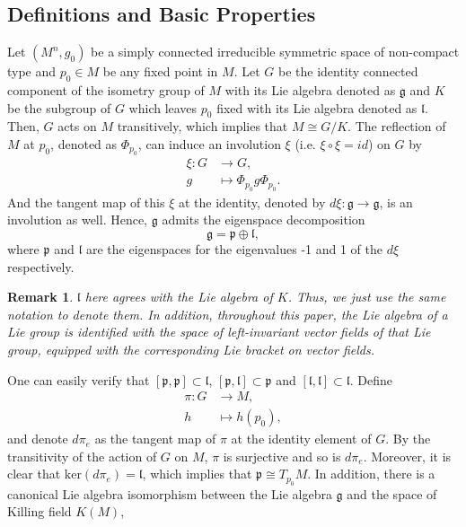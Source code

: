 \documentclass[12pt]{amsart}
\newtheorem{remark}{Remark}[section]
\begin{document}
\subsection{Definitions and Basic Properties}
Let $(M^n, g_0)$ be a simply connected irreducible symmetric space of non-compact type and $p_0\in M$ be any fixed point in $M$. Let $G$ be the identity connected component of the isometry group of $M$ with its Lie algebra denoted as $\mathfrak{g}$ and $K$ be the subgroup of $G$ which leaves $p_0$ fixed with its Lie algebra denoted as $\mathfrak{l}$. Then, $G$ acts on $M$ transitively, which implies that $M\cong G / K$. The reflection of $M$ at $p_0$, denoted as $\Phi_{p_0}$, can induce an involution $\xi$ (i.e. $\xi\circ\xi = id$) on $G$ by  
\begin{equation}
    \begin{split}
        \xi: G &\rightarrow G, \\
             g &\mapsto \Phi_{p_0}g \Phi_{p_0}.
    \end{split}
\end{equation}
And the tangent map of this $\xi$ at the identity, denoted by $d\xi : \mathfrak{g} \rightarrow \mathfrak{g}$, is an involution as well. Hence, $\mathfrak{g}$ admits the eigenspace decomposition  
\begin{equation}
    \mathfrak{g} = \mathfrak{p}\oplus\mathfrak{l},
\end{equation}
where $\mathfrak{p}$ and $\mathfrak{l}$ are the eigenspaces for the eigenvalues -1 and 1 of the $d\xi$ respectively. 
\begin{remark}
    $\mathfrak{l}$ here agrees with the Lie algebra of $K$. Thus, we just use the same notation to denote them. In addition, throughout this paper, the Lie algebra of a Lie group is identified with the space of left-invariant vector fields of that Lie group, equipped with the corresponding Lie bracket on vector fields.
\end{remark}
One can easily verify that $[\mathfrak{p}, \mathfrak{p}] \subset \mathfrak{l}$, $[\mathfrak{p}, \mathfrak{l}] \subset \mathfrak{p}$ and $[\mathfrak{l}, \mathfrak{l}] \subset \mathfrak{l}$. 
Define 
\begin{equation}
    \begin{split}
        \pi: G &\rightarrow M, \\
             h &\mapsto h(p_0),
    \end{split}
\end{equation}
and denote $d\pi_e$ as the tangent map of $\pi$ at the identity element of $G$. By the transitivity of the action of $G$ on $M$, $\pi$ is surjective and so is $d\pi_{e}$. Moreover, it is clear that $\mathrm{ker}(d\pi_{e}) = \mathfrak{l}$, which implies that $\mathfrak{p} \cong T_{p_0} M$. In addition, there is a canonical Lie algebra isomorphism between the Lie algebra $\mathfrak{g}$ and the space of Killing field $K(M)$, 
\end{document}
